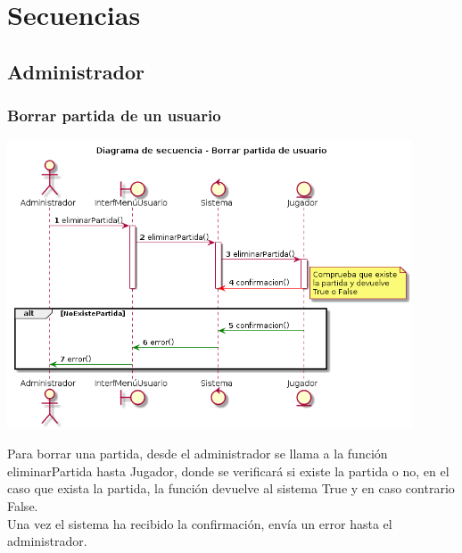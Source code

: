 \section{Secuencias}\label{sec:uc0}


\subsection{Administrador}\label{sec:uc0}
\subsubsection{Borrar partida de un usuario}
\begin{center}
	  \includegraphics[width=0.9\textwidth]{./imatges/administrador/Borrar_partida_de_usuario.png}
\end{center}
Para borrar una partida, desde el administrador se llama a la función eliminarPartida hasta Jugador, donde se verificará si existe la partida o no, en el caso que exista la partida, la función devuelve al sistema True y en caso contrario False. \\
	Una vez el sistema ha recibido la confirmación, envía un error hasta el administrador.

